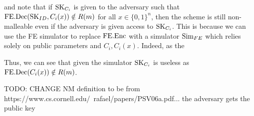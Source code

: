 and note that
if $\text{SK}_{C_i}$ is given to the adversary such that $\text{FE.Dec}(\text{SK}_{ID}, C_i(x)) \notin R(m)$ for all $x \in \{0, 1\}^n$,
then the scheme is still non-malleable even if the adversary is given access to $\text{SK}_{C_i}$.
This is because we can use the FE simulator to replace $\text{FE.Enc}$ with a simulator $\text{Sim}_{FE}$ which relies
solely on public parameters and $C_i, C_i(x)$. Indeed, as the 

Thus, we can see that given the simulator $\text{SK}_{C_i}$ is useless
as $\text{FE.Dec}(C_i(x)) \notin R(m)$.

TODO: CHANGE NM definition to be from https://www.cs.cornell.edu/~rafael/papers/PSV06a.pdf...
the adversary gets the public key



